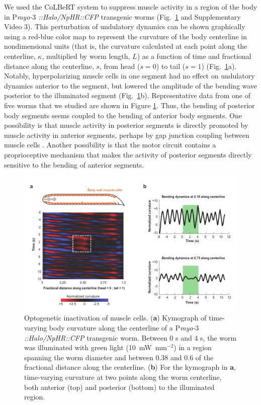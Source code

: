 We used the CoLBeRT system to suppress muscle activity in a region of the body in P\textit{myo-$3$ ::Halo/NpHR::CFP} transgenic worms (Fig.~\ref{fig:colbert2} and Supplementary Video 3). This perturbation of undulatory dynamics can be shown graphically using a red-blue color map to represent the curvature of the body centerline in nondimensional units (that is, the curvature calculated at each point along the centerline, $\kappa$, multiplied by worm length, $L$) as a function of time and fractional distance along the centerline, $s$, from head ($s = 0$) to tail ($s = 1$) (Fig.~\ref{fig:colbert2}a). Notably, hyperpolarizing muscle cells in one segment had no effect on undulatory dynamics anterior to the segment, but lowered the amplitude of the bending wave posterior to the illuminated segment (Fig.~\ref{fig:colbert2}b). Representative data from one of five worms that we studied are shown in Figure \ref{fig:colbert2}. Thus, the bending of posterior body segments seems coupled to the bending of anterior body segments. One possibility is that muscle activity in posterior segments is directly promoted by muscle activity in anterior segments, perhaps by gap junction coupling between muscle cells \citep{liu_low_2006}. Another possibility is that the motor circuit contains a proprioceptive mechanism that makes the activity of posterior segments directly sensitive to the bending of anterior segments.

\begin{figure} 
\includegraphics[width=\textwidth]{figures/colbert2}
\caption[Optogenetic inactivation of muscle cells.]{Optogenetic inactivation of muscle cells. (\textbf{a}) Kymograph of time-varying body curvature along the centerline of a P\textit{myo-$3$::Halo/NpHR::CFP} transgenic worm. Between 0 s and 4 s, the worm was illuminated with green light (10~mW~mm$^{-2}$) in a region spanning the worm diameter and between 0.38 and 0.6 of the fractional distance along the centerline. (\textbf{b}) For the kymograph in \textbf{a}, time-varying curvature at two points along the worm centerline, both anterior (top) and posterior (bottom) to the illuminated region. \label{fig:colbert2}}
\end{figure}


